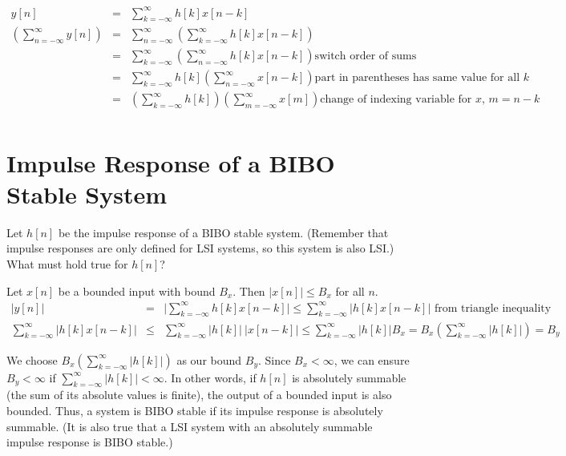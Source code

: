 \documentclass[11pt]{article}
\begin{document}
{\color{blue}
\begin{eqnarray*}
y[n] &=& \sum\limits_{k=-\infty}^\infty h[k]x[n-k] \\
\left(\sum\limits_{n=-\infty}^\infty y[n] \right) &=& \sum\limits_{n=-\infty}^\infty \left( \sum\limits_{k=-\infty}^\infty h[k]x[n-k] \right) \\
 &=& \sum\limits_{k=-\infty}^\infty \left( \sum\limits_{n=-\infty}^\infty h[k]x[n-k] \right) \text{switch order of sums} \\
&=& \sum\limits_{k=-\infty}^\infty h[k] \left(\sum\limits_{n=-\infty}^\infty x[n-k] \right) \text{part in parentheses has same value for all $k$}\\
&=& \left(\sum\limits_{k=-\infty}^\infty h[k]\right) \left(\sum\limits_{m=-\infty}^\infty x[m] \right) \text{change of indexing variable for $x$, $m=n-k$} \\
\end{eqnarray*}
}

\section{Impulse Response of a BIBO Stable System}
Let $h[n]$ be the impulse response of a BIBO stable system. (Remember that impulse responses are only defined for LSI systems, so this system is also LSI.) What must hold true for $h[n]$?

{\color{blue}
Let $x[n]$ be a bounded input with bound $B_x$. Then $|x[n]| \leq B_x$ for all $n$.
\begin{eqnarray*}
|y[n]| &=& \big|\sum\limits_{k=-\infty}^\infty h[k]x[n-k]\big|
\leq  \sum\limits_{k=-\infty}^\infty \big| h[k]x[n-k]\big| \text{ from triangle inequality} \\
\sum\limits_{k=-\infty}^\infty \big| h[k]x[n-k]\big| &\leq & \sum\limits_{k=-\infty}^\infty \big| h[k]\big|\ \big|x[n-k]\big| \leq  \sum\limits_{k=-\infty}^\infty \big| h[k]\big|  B_x = B_x \left(\sum\limits_{k=-\infty}^\infty \big| h[k]\big| \right) = B_y
\end{eqnarray*}

We choose $B_x \left(\sum\limits_{k=-\infty}^\infty \big| h[k]\big| \right)$ as our bound $B_y$. Since $B_x < \infty$, we can ensure $B_y < \infty$ if $\sum\limits_{k=-\infty}^\infty \big| h[k]\big| < \infty$. In other words, if $h[n]$ is absolutely summable (the sum of its absolute values is finite), the output of a bounded input is also bounded. Thus, a system is BIBO stable if its impulse response is absolutely summable. (It is also true that a LSI system with an absolutely summable impulse response is BIBO stable.)
}
\end{document}
